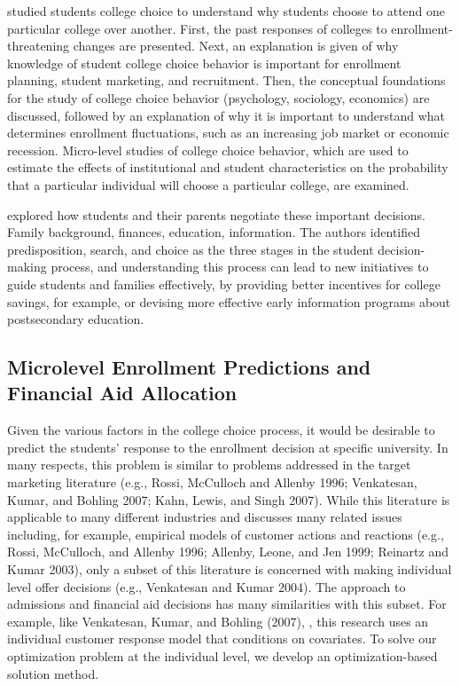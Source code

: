 \documentclass[12pt,english]{report}
\begin{document}
\citet{Paulsen1990} studied students college choice to understand why students
choose to attend one particular college over another. First, the past responses
of colleges to enrollment-threatening changes are presented. Next, an
explanation is given of why knowledge of student college choice behavior is
important for enrollment planning, student marketing, and recruitment. Then,
the conceptual foundations for the study of college choice behavior
(psychology, sociology, economics) are discussed, followed by an explanation of
why it is important to understand what determines enrollment fluctuations, such
as an increasing job market or economic recession. Micro-level studies of
college choice behavior, which are used to estimate the effects of
institutional and student characteristics on the probability that a particular
individual will choose a particular college, are examined.

\citet{Hossler1998} explored how students and their parents negotiate these
important decisions. Family background, finances, education, information. The
authors identified predisposition, search, and choice as the three stages in
the student decision-making process, and understanding this process can lead to
new initiatives to guide students and families effectively, by providing better
incentives for college savings, for example, or devising more effective early
information programs about postsecondary education.

\subsection{Microlevel Enrollment Predictions and Financial Aid Allocation} 


Given the various factors in the college choice process, it would be desirable
to predict the students' response to the enrollment decision at specific
university.  In many respects, this problem is similar to problems addressed in
the target marketing literature (e.g., Rossi, McCulloch and Allenby 1996;
Venkatesan, Kumar, and Bohling 2007; Kahn, Lewis, and Singh 2007). While this
literature is applicable to many different industries and discusses many
related issues including, for example, empirical models of customer actions and
reactions (e.g., Rossi, McCulloch, and Allenby 1996; Allenby, Leone, and Jen
1999; Reinartz and Kumar 2003), only a subset of this literature is concerned
with making individual level offer decisions (e.g., Venkatesan and Kumar 2004).
The approach to admissions and financial aid decisions has many similarities
with this subset.  For example, like Venkatesan, Kumar, and Bohling (2007),
\citep{Carter2011}, this research uses an individual customer response model
that conditions on covariates.  To solve our optimization problem at
the individual level, we develop an optimization-based solution method.
\end{document}
